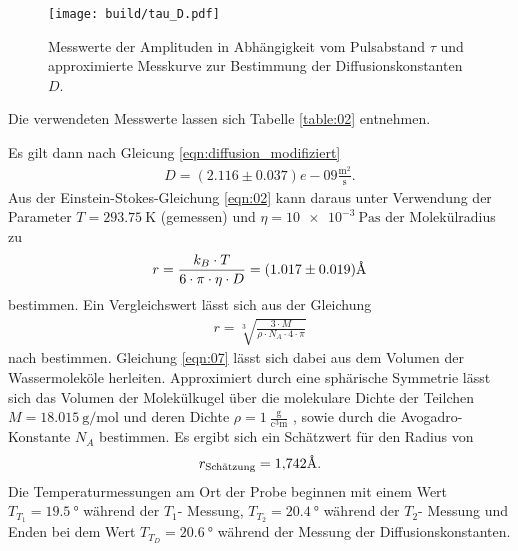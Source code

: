 \FloatBarrier
\begin{figure}
  \texttt{[image: build/tau\_D.pdf]}
  \caption{Messwerte der Amplituden in Abhängigkeit vom Pulsabstand $\tau$ und
  approximierte Messkurve zur Bestimmung der Diffusionskonstanten $D$.}
  \label{fig:03}
\end{figure}
\FloatBarrier
\noindent Die verwendeten Messwerte lassen sich Tabelle \ref{table:02} entnehmen.
\FloatBarrier

\FloatBarrier
\noindent Es gilt dann nach Gleicung \ref{eqn:diffusion_modifiziert}
\begin{align*}
  D = (2.116 \pm 0.037)e-09 \frac{\si{\meter^2}}{\si{\second}}.
\end{align*}
\noindent Aus der Einstein-Stokes-Gleichung \ref{eqn:02} kann daraus unter Verwendung der
Parameter $T = \SI{293.75}{\kelvin}$ (gemessen) und $\eta = \SI{10e-3}{\pascal\second}$
\cite{Viskosität_Wasser} der Molekülradius zu
\begin{align*}
 r = \frac{k_B \cdot T}{6 \cdot \pi \cdot \eta \cdot D} = (1.017\pm 0.019) \text{\r{A}}
\end{align*}
\noindent bestimmen. Ein Vergleichswert lässt sich aus der Gleichung
\begin{align}
  r = \sqrt[3]{\frac{3 \cdot M}{\rho \cdot N_A \cdot 4 \cdot \pi}}
  \label{eqn:07}
\end{align}
\noindent nach \cite{radius} bestimmen. Gleichung \ref{eqn:07} lässt sich dabei
aus dem Volumen der Wassermoleköle herleiten. Approximiert durch eine sphärische
Symmetrie lässt sich das Volumen der Molekülkugel über die molekulare
Dichte der Teilchen $M = \SI{18.015}{\gram\per\mol}$
und deren Dichte $\rho = 1 \: \frac{\si{\gram}}{\si{\cubic\centi\meter}}$
\cite{Viskosität_Wasser}, sowie durch die Avogadro-Konstante $N_A$ bestimmen.
Es ergibt sich ein Schätzwert für den Radius von
\begin{align*}
  r_\text{Schätzung} = \num{1.742} \text{\r{A}}.
\end{align*}
\noindent Die Temperaturmessungen am Ort der Probe beginnen mit einem Wert
$T_{T_1} = \SI{19.5}{\degree}$ während der $T_1$- Messung,
$T_{T_2} = \SI{20.4}{\degree}$ während der $T_2$- Messung und Enden bei dem Wert
$T_{T_D} = \SI{20.6}{\degree}$ während der Messung der Diffusionskonstanten.
